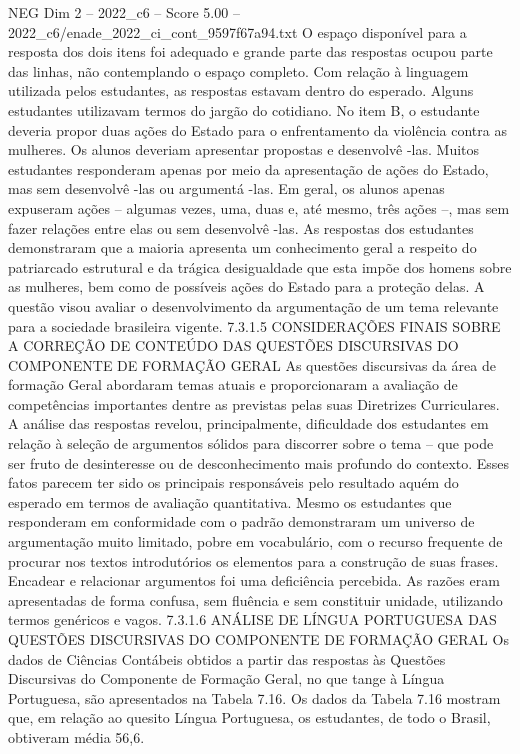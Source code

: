 \begin{textsample}{NEG Dim 2 – 2022\_c6 – Score 5.00 – 2022\_c6/enade\_2022\_ci\_cont\_9597f67a94.txt}
O espaço disponível para a resposta dos dois itens foi adequado e grande parte das respostas ocupou parte das linhas, não contemplando o espaço completo.
Com relação à linguagem utilizada pelos estudantes, as respostas estavam dentro do esperado.
Alguns estudantes utilizavam termos do jargão do cotidiano.
No item B, o estudante deveria propor duas ações do Estado para o enfrentamento da violência contra as mulheres.
Os alunos deveriam apresentar propostas e desenvolvê -las.
Muitos estudantes responderam apenas por meio da apresentação de ações do Estado, mas sem desenvolvê -las ou argumentá -las.
Em geral, os alunos apenas expuseram ações – algumas vezes, uma, duas e, até mesmo, três ações –, mas sem fazer relações entre elas ou sem desenvolvê -las.
As respostas dos estudantes demonstraram que a maioria apresenta um conhecimento geral a respeito do patriarcado estrutural e da trágica desigualdade que esta impõe dos homens sobre as mulheres, bem como de possíveis ações do Estado para a proteção delas.
A questão visou avaliar o desenvolvimento da argumentação de um tema relevante para a sociedade brasileira vigente. 7.3.1.5 CONSIDERAÇÕES FINAIS SOBRE A CORREÇÃO DE CONTEÚDO DAS QUESTÕES DISCURSIVAS DO COMPONENTE DE FORMAÇÃO GERAL As questões discursivas da área de formação Geral abordaram temas atuais e proporcionaram a avaliação de competências importantes dentre as previstas pelas suas Diretrizes Curriculares.
A análise das respostas revelou, principalmente, dificuldade dos estudantes em relação à seleção de argumentos sólidos para discorrer sobre o tema – que pode ser fruto de desinteresse ou de desconhecimento mais profundo do contexto.
Esses fatos parecem ter sido os principais responsáveis pelo resultado aquém do esperado em termos de avaliação quantitativa.
Mesmo os estudantes que responderam em conformidade com o padrão demonstraram um universo de argumentação muito limitado, pobre em vocabulário, com o recurso frequente de procurar nos textos introdutórios os elementos para a construção de suas frases.
Encadear e relacionar argumentos foi uma deficiência percebida.
As razões eram apresentadas de forma confusa, sem fluência e sem constituir unidade, utilizando termos genéricos e vagos. 7.3.1.6 ANÁLISE DE LÍNGUA PORTUGUESA DAS QUESTÕES DISCURSIVAS DO COMPONENTE DE FORMAÇÃO GERAL Os dados de Ciências Contábeis obtidos a partir das respostas às Questões Discursivas do Componente de Formação Geral, no que tange à Língua Portuguesa, são apresentados na Tabela 7.16.
Os dados da Tabela 7.16 mostram que, em relação ao quesito Língua Portuguesa, os estudantes, de todo o Brasil, obtiveram média 56,6.

\end{textsample}
